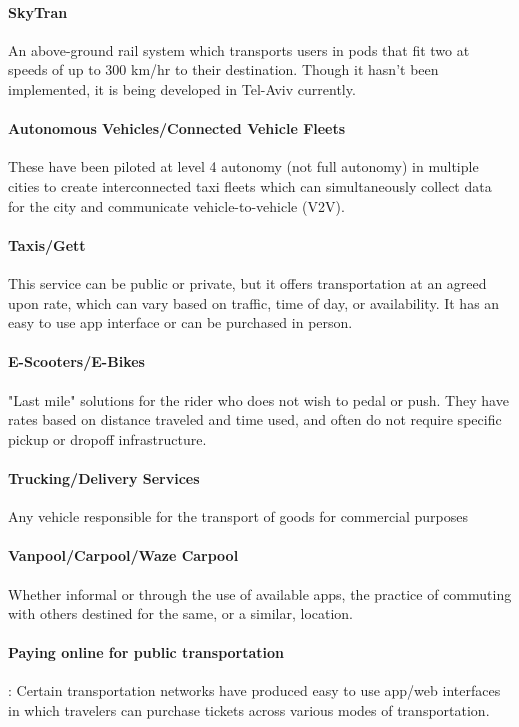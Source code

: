\documentclass[12pt]{article}                       %
\begin{document}
\paragraph{SkyTran} An above-ground rail system which transports users in pods that fit two at speeds of up to 300 km/hr to their destination. Though it hasn't been implemented, it is being developed in Tel-Aviv currently.

\paragraph{Autonomous Vehicles/Connected Vehicle Fleets} These have been piloted at level 4 autonomy (not full autonomy) in multiple cities to create interconnected taxi fleets which can simultaneously collect data for the city and communicate vehicle-to-vehicle (V2V).

\paragraph{Taxis/Gett} This service can be public or private, but it offers transportation at an agreed upon rate, which can vary based on traffic, time of day, or availability. It has an easy to use app interface or can be purchased in person. 

\paragraph{E-Scooters/E-Bikes} "Last mile" solutions for the rider who does not wish to pedal or push. They have rates based on distance traveled and time used, and often do not require specific pickup or dropoff infrastructure.

\paragraph{Trucking/Delivery Services} Any vehicle responsible for the transport of goods for commercial purposes

\paragraph{Vanpool/Carpool/Waze Carpool} Whether informal or through the use of available apps, the practice of commuting with others destined for the same, or a similar, location.

\paragraph{Paying online for public transportation}: Certain transportation networks have produced easy to use app/web interfaces in which travelers can purchase tickets across various modes of transportation.
\end{document}
